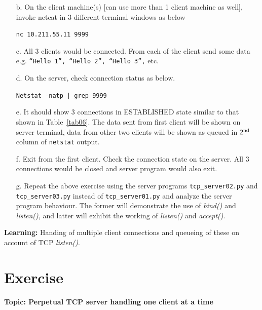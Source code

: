 \begin{multicols}{2}
\begin{itemize}
\item[b.] On the client machine(s) [can use more than 1 client machine as well], invoke netcat in 3 different terminal windows as below

\texttt{nc 10.211.55.11 9999}

\item[c.] All 3 clients would be connected. From each of the client send some data e.g. \texttt{“Hello 1”, “Hello 2”, “Hello 3”,} etc.

\item[d.] On the server, check connection status as below.

\texttt{Netstat -natp | grep 9999}

\item[e.] It should show 3 connections in ESTABLISHED state similar to that shown in Table~\ref{tab06}. The data sent from first client will be shown on server terminal, data from other two clients will be shown as queued in $2^{\rm nd}$ column of \texttt{netstat} output.

\item[f.] Exit from the first client. Check the connection state on the server. All 3 connections would be closed and server program would also exit.

\item[g.] Repeat the above exercise using the server programs \texttt{tcp\_server02.py} and \texttt{tcp\_server03.py} instead of \texttt{tcp\_server01.py} and analyze the server program behaviour. The former will demonstrate the use of \textit{bind()} and \textit{listen()}, and latter will exhibit the working of \textit{listen()} and \textit{accept()}.
\end{itemize}

\vspace{-.3cm}

\textbf{Learning:} Handing of multiple client connections and queueing of these on account of TCP \textit{listen()}.

\vspace{-.3cm}

\section*{Exercise \label{chap1-exe02}}

\textbf{Topic: Perpetual TCP server handling one client at a time}

\begin{itemize}


\end{itemize}
\end{multicols}
